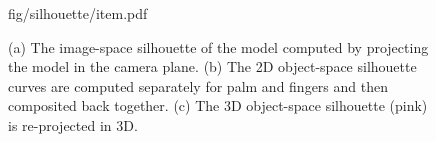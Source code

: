 \begin{figure}[t!]
\centering
\begin{overpic} 
[width=\linewidth]
{fig/silhouette/item.pdf}
\end{overpic}
\caption{
% 
% 
(a) The image-space silhouette of the model computed by projecting the model in the camera plane.
(b) The 2D object-space silhouette curves are computed separately for palm and fingers and then composited back together.
(c) The 3D object-space silhouette (pink) is re-projected in 3D.
% 
% 
} 
\label{fig:silhouette}
\end{figure}